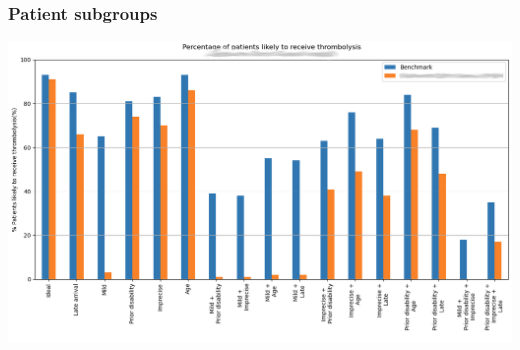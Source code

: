 \begin{frame}
\frametitle{Patient subgroups}

\begin{center}
\includegraphics[width=1.0\textwidth]{./images_outcome/hosp_subgroups_1}
\end{center}

\end{frame}
